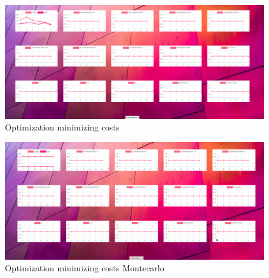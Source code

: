     \begin{figure}[H]
        \centering
        \includegraphics[width=1\textwidth]{assets/opt2.jpeg}
        \caption{Optimization minimizing costs}
        \label{fig:stella_outliers}
        \end{figure}


        \begin{figure}[H]
            \centering
            \includegraphics[width=1\textwidth]{assets/opt3.jpeg}
            \caption{Optimization minimizing costs Montecarlo}
            \label{fig:stella_outliers}
            \end{figure}


            